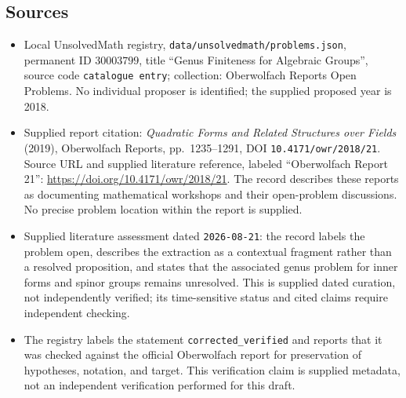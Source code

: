 \documentclass[11pt]{article}
\begin{document}
\subsection{Sources}
\begin{itemize}
\item Local UnsolvedMath registry, \texttt{data/unsolvedmath/problems.json}, permanent ID \(30003799\), title ``Genus Finiteness for Algebraic Groups'', source code \texttt{catalogue entry}; collection: Oberwolfach Reports Open Problems. No individual proposer is identified; the supplied proposed year is 2018.
\item Supplied report citation: \emph{Quadratic Forms and Related Structures over Fields} (2019), Oberwolfach Reports, pp.~1235--1291, DOI \texttt{10.4171/owr/2018/21}. Source URL and supplied literature reference, labeled ``Oberwolfach Report 21'': \url{https://doi.org/10.4171/owr/2018/21}. The record describes these reports as documenting mathematical workshops and their open-problem discussions. No precise problem location within the report is supplied.
\item Supplied literature assessment dated \texttt{2026-08-21}: the record labels the problem open, describes the extraction as a contextual fragment rather than a resolved proposition, and states that the associated genus problem for inner forms and spinor groups remains unresolved. This is supplied dated curation, not independently verified; its time-sensitive status and cited claims require independent checking.
\item The registry labels the statement \texttt{corrected\_verified} and reports that it was checked against the official Oberwolfach report for preservation of hypotheses, notation, and target. This verification claim is supplied metadata, not an independent verification performed for this draft.
\end{itemize}
\end{document}
